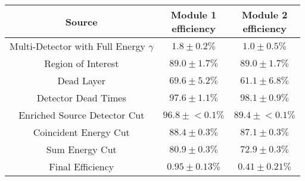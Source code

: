 \begin{tabular}{|c|c|c|}
\hline
  Source & \makecell{Module 1\\efficiency} & \makecell{Module 2\\efficiency} \\
\hline
  \makecell{Multi-Detector with\\Full Energy $\gamma$} & $1.8 \pm 0.2\%$ & $1.0 \pm 0.5\%$ \\
  Region of Interest & $89.0 \pm 1.7\%$ & $89.0 \pm 1.7\%$ \\
  Dead Layer & $69.6 \pm 5.2\%$ & $61.1 \pm 6.8\%$ \\
  Detector Dead Times & $97.6 \pm 1.1\%$ & $98.1 \pm 0.9\%$ \\
  Enriched Source Detector Cut & $96.8 \pm{}<\!0.1\%$ & $89.4 \pm{}<\!0.1\%$ \\
  Coincident Energy Cut & $88.4 \pm 0.3\%$ & $87.1 \pm 0.3\%$ \\
  Sum Energy Cut & $80.9 \pm 0.3\%$ & $72.9 \pm 0.3\%$ \\
  \hline Final Efficiency & $0.95 \pm 0.13\%$ & $0.41 \pm 0.21\%$ \\
\hline
\end{tabular}
